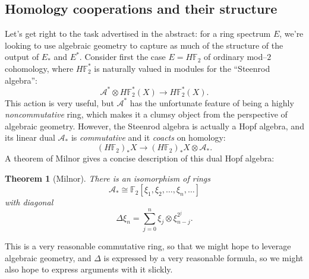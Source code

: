 \documentclass{amsart}
\newcommand{\F}{\mathbb F}
\newcommand{\<}{\langle}
\renewcommand{\>}{\rangle}
\theoremstyle{plain}
\newtheorem*{theorem}{Theorem}
\theoremstyle{definition}
\theoremstyle{remark}
\begin{document}
\subsection{Homology cooperations and their structure}

Let's get right to the task advertised in the abstract: for a ring spectrum $E$, we're looking to use algebraic geometry to capture as much of the structure of the output of $E_*$ and $E^*$.  Consider first the case $E = H\F_2$ of ordinary mod--$2$ cohomology, where $H\F_2^*$ is naturally valued in modules for the ``Steenrod algebra'': \[\mathcal A^* \otimes H\F_2^*(X) \to H\F_2^*(X).\]  This action is very useful, but $\mathcal A^*$ has the unfortunate feature of being a highly \emph{noncommutative} ring, which makes it a clumsy object from the perspective of algebraic geometry.  However, the Steenrod algebra is actually a Hopf algebra, and its linear dual $\mathcal A_*$ is \emph{commutative} and it \emph{coacts} on homology: \[(H\F_2)_* X \to (H\F_2)_* X \otimes \mathcal A_*.\]  A theorem of Milnor gives a concise description of this dual Hopf algebra:
\begin{theorem}[Milnor]
There is an isomorphism of rings \[\mathcal A_* \cong \F_2[\xi_1, \xi_2, \ldots, \xi_n, \ldots]\] with diagonal \[\Delta \xi_n = \sum_{j=0}^n \xi_j \otimes \xi_{n-j}^{2^j}.\]
\end{theorem}
\noindent This is a very reasonable commutative ring, so that we might hope to leverage algebraic geometry, and $\Delta$ is expressed by a very reasonable formula, so we might also hope to express arguments with it slickly.
\end{document}
